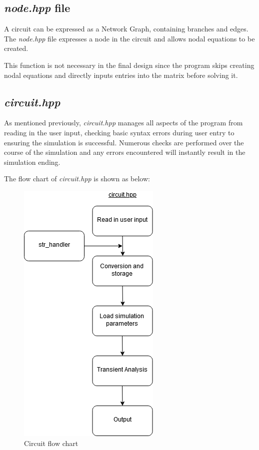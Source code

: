 \documentclass[12pt,a4paper]{article}
\begin{document}
	\subsection{\textit{node.hpp} file}
	A circuit can be expressed as a Network Graph, containing branches and edges.
	The \textit{node.hpp} file expresses a node in the circuit and allows nodal equations
	to be created.\par
	This function is not necessary in the final design since the program skips creating nodal
	equations and directly inputs entries into the matrix before solving it.
	\pagebreak
	\subsection{\textit{circuit.hpp}}
	As mentioned previously, \textit{circuit.hpp} manages all aspects of the program from 
	reading in the user input, checking basic syntax errors during user entry 
	to ensuring the simulation is successful.
	Numerous checks are performed over the course of the simulation and any errors encountered
	will instantly result in the simulation ending. \par
	
	The flow chart of \textit{circuit.hpp} is shown as below: \par
	\begin{figure} [h!]
		\centering
		\includegraphics[scale=0.5]{circuit.PNG}
		\caption{Circuit flow chart}
	\end{figure}
	\pagebreak
\end{document}
